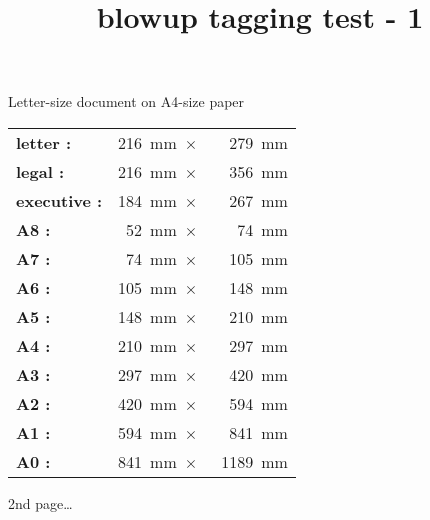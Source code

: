 \documentclass[letterpaper,twoside]{article}
\title{blowup tagging test - 1}
\begin{document}
\null\vfill

\huge\centering

Letter-size document on A4-size paper

\vfill

\setlength\extrarowheight{.5ex}
\begin{tabular}{|>{\bfseries}l<{:}r<{\,mm~$\times$~}r<{\,mm}|} \hline
  letter    & 216 &  279 \\
  legal     & 216 &  356 \\
  executive & 184 &  267 \\
  A8        &  52 &   74 \\
  A7        &  74 &  105 \\
  A6        & 105 &  148 \\
  A5        & 148 &  210 \\
  A4        & 210 &  297 \\
  A3        & 297 &  420 \\
  A2        & 420 &  594 \\
  A1        & 594 &  841 \\
  A0        & 841 & 1189 \\ \hline
\end{tabular}

\vfill

\newpage\null 2nd page\dots
\end{document}
